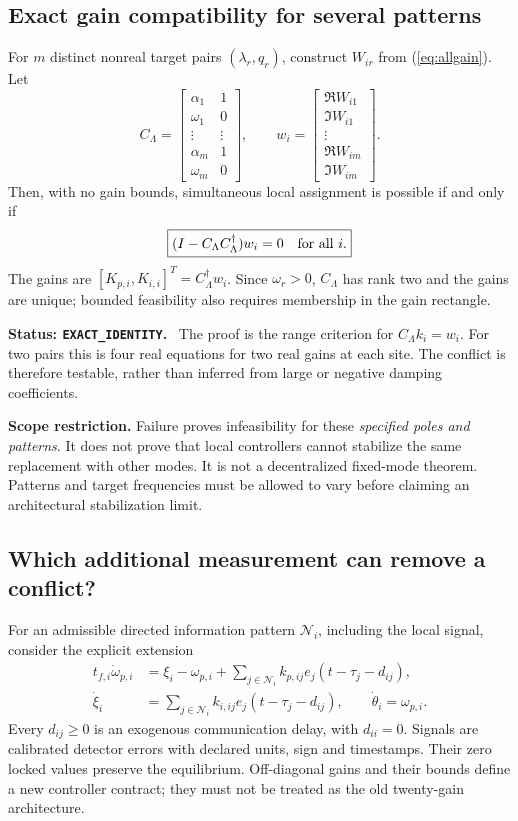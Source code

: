 \documentclass[11pt]{article}
\newcommand{\status}[1]{\par\smallskip\noindent\textbf{Status: \texttt{#1}.}\ }
\begin{document}
\subsection{Exact gain compatibility for several patterns}
For $m$ distinct nonreal target pairs $(\lambda_r,q_r)$, construct
$W_{ir}$ from (\ref{eq:allgain}). Let
\[
 C_\Lambda=
 \begin{bmatrix}
 \alpha_1&1\\ \omega_1&0\\
 \vdots&\vdots\\ \alpha_m&1\\ \omega_m&0
 \end{bmatrix},\qquad
 w_i=\begin{bmatrix}\Re W_{i1}\\\Im W_{i1}\\
 \vdots\\\Re W_{im}\\\Im W_{im}\end{bmatrix}.
\]
Then, with no gain bounds, simultaneous local assignment is possible
if and only if
\begin{equation}
 \boxed{(I-C_\Lambda C_\Lambda^\dagger)w_i=0
 \quad\hbox{for all }i.} \label{eq:compat}
\end{equation}
The gains are $[K_{p,i},K_{i,i}]^T=C_\Lambda^\dagger w_i$.
Since $\omega_r>0$, $C_\Lambda$ has rank two and the gains are unique;
bounded feasibility also requires membership in the gain rectangle.
\status{EXACT\_IDENTITY}
The proof is the range criterion for $C_\Lambda k_i=w_i$.
For two pairs this is four real equations for two real gains at each
site. The conflict is therefore testable, rather than inferred from
large or negative damping coefficients.

\textbf{Scope restriction.} Failure proves infeasibility for these
\emph{specified poles and patterns}. It does not prove that local
controllers cannot stabilize the same replacement with other modes.
It is not a decentralized fixed-mode theorem. Patterns and target
frequencies must be allowed to vary before claiming an architectural
stabilization limit.

\subsection{Which additional measurement can remove a conflict?}
For an admissible directed information pattern $\mathcal N_i$, including
the local signal, consider the explicit extension
\begin{align*}
 t_{f,i}\dot\omega_{p,i}
 &=\xi_i-\omega_{p,i}
   +\sum_{j\in\mathcal N_i}k_{p,ij}e_j(t-\tau_j-d_{ij}),\\
 \dot\xi_i&=\sum_{j\in\mathcal N_i}k_{i,ij}e_j(t-\tau_j-d_{ij}),
 \qquad \dot\theta_i=\omega_{p,i}.
\end{align*}
Every $d_{ij}\ge0$ is an exogenous communication delay, with $d_{ii}=0$.
Signals are calibrated detector errors with declared units, sign and
timestamps. Their zero locked values preserve the equilibrium.
Off-diagonal gains and their bounds define a new controller contract;
they must not be treated as the old twenty-gain architecture.
\end{document}
